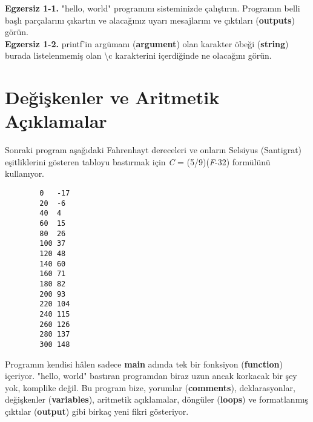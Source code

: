 \documentclass[a4paper,12pt,oneside]{book}
\begin{document}
\noindent \textbf{Egzersiz 1-1.} "hello, world" programını sisteminizde çalıştırın. Programın belli başlı parçalarını çıkartın ve alacağınız uyarı mesajlarını ve çıktıları (\textbf{outputs}) görün. \\

\noindent \textbf{Egzersiz 1-2.} printf'in argümanı (\textbf{argument}) olan karakter öbeği (\textbf{string}) burada listelenmemiş olan \textbackslash c karakterini içerdiğinde ne olacağını görün.

\section{Değişkenler ve Aritmetik Açıklamalar}

Sonraki program aşağıdaki Fahrenhayt dereceleri ve onların Selsiyus (Santigrat) eşitliklerini gösteren tabloyu bastırmak için \degree \textit{C} = (5/9)(\degree \textit{F}-32) formülünü kullanıyor. \pagebreak

\begin{lstlisting}
        0   -17
        20  -6
        40  4
        60  15
        80  26
        100 37
        120 48
        140 60
        160 71
        180 82
        200 93
        220 104
        240 115
        260 126
        280 137
        300 148
\end{lstlisting}
\par Programın kendisi hâlen sadece \textbf{main} adında tek bir fonksiyon (\textbf{function}) içeriyor. "hello, world" bastıran programdan biraz uzun ancak korkacak bir şey yok, komplike değil. Bu program bize, yorumlar (\textbf{comments}), deklarasyonlar, değişkenler (\textbf{variables}), aritmetik açıklamalar, döngüler (\textbf{loops}) ve formatlanmış çıktılar (\textbf{output}) gibi birkaç yeni fikri gösteriyor.
\end{document}
